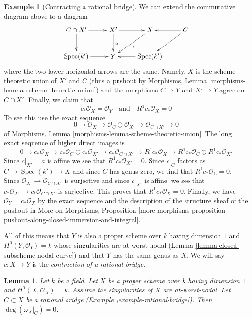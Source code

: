 \documentclass{stacks-project}
\theoremstyle{plain}
\newtheorem{lemma}[subsection]{Lemma}
\theoremstyle{definition}
\newtheorem{example}[subsection]{Example}
\theoremstyle{remark}
\numberwithin{equation}{subsection}
\def\Spec{\mathop{\mathrm{Spec}}}
\begin{document}
\begin{example}[Contracting a rational bridge]
\medskip\noindent
We can extend the commutative diagram above to a diagram
$$
\xymatrix{
C \cap X' \ar[r] \ar[d] &
X' \ar[d]^a \ar[r] & X \ar[ld]^c &
C \ar[ld] \ar[l] \\
\Spec(k') \ar[r] &
Y &
\Spec(k') \ar[l]
}
$$
where the two lower horizontal arrows are the same. Namely, $X$ is the
scheme theoretic union of $X'$ and $C$ (thus a pushout by
Morphisms, Lemma \ref{morphisms-lemma-scheme-theoretic-union})
and the morphisms $C \to Y$ and $X' \to Y$ agree on $C \cap X'$.
Finally, we claim that
$$
c_*\mathcal{O}_X = \mathcal{O}_Y
\quad\text{and}\quad
R^1c_*\mathcal{O}_X = 0
$$
To see this use the exact sequence
$$
0 \to \mathcal{O}_X \to
\mathcal{O}_C \oplus \mathcal{O}_{X'} \to
\mathcal{O}_{C \cap X'} \to 0
$$
of Morphisms, Lemma \ref{morphisms-lemma-scheme-theoretic-union}.
The long exact sequence of higher direct images is
$$
0 \to c_*\mathcal{O}_X \to c_*\mathcal{O}_C \oplus c_*\mathcal{O}_{X'} \to
c_*\mathcal{O}_{C \cap X'} \to
R^1c_*\mathcal{O}_X \to
R^1c_*\mathcal{O}_C \oplus R^1c_*\mathcal{O}_{X'}
$$
Since $c|_{X'} = a$ is affine we see that
$R^1c_*\mathcal{O}_{X'} = 0$.
Since $c|_C$ factors as $C \to \Spec(k') \to X$ and since
$C$ has genus zero, we find that $R^1c_*\mathcal{O}_C = 0$.
Since $\mathcal{O}_{X'} \to \mathcal{O}_{C \cap X'}$ is
surjective and since $c|_{X'}$ is affine, we see that
$c_*\mathcal{O}_{X'} \to c_*\mathcal{O}_{C \cap X'}$
is surjective. This proves that $R^1c_*\mathcal{O}_X = 0$.
Finally, we have
$\mathcal{O}_Y = c_*\mathcal{O}_X$ by
the exact sequence and
the description of the structure sheaf of the pushout
in More on Morphisms, Proposition
\ref{more-morphisms-proposition-pushout-along-closed-immersion-and-integral}.

\medskip\noindent
All of this means that $Y$ is also a proper scheme over $k$
having dimension $1$ and $H^0(Y, \mathcal{O}_Y) = k$
whose singularities are at-worst-nodal
(Lemma \ref{lemma-closed-subscheme-nodal-curve})
and that $Y$ has the same genus as $X$.
We will say $c : X \to Y$ is the
{\it contraction of a rational bridge}.
\end{example}

\begin{lemma}
\label{lemma-rational-bridge-zero}
Let $k$ be a field. Let $X$ be a proper scheme over $k$ having dimension $1$
and $H^0(X, \mathcal{O}_X) = k$. Assume the singularities of $X$ are
at-worst-nodal. Let $C \subset X$ be a rational bridge
(Example \ref{example-rational-bridge}). Then $\deg(\omega_X|_C) = 0$.
\end{lemma}
\end{document}
